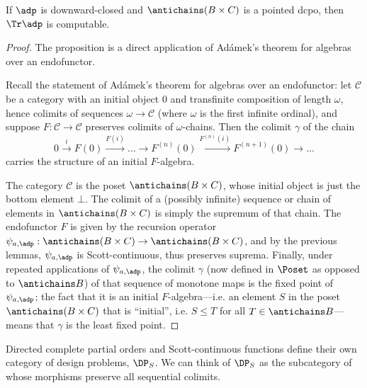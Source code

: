 

\begin{proposition}
If $\adp$ is downward-closed and $\antichains (B \times C)$ is a pointed dcpo, then $\Tr \adp$ is computable.
\end{proposition}

\begin{proof}
The proposition is a direct application of Ad\'amek's theorem for algebras over an endofunctor.

Recall the statement of Ad\'amek's theorem for algebras over an endofunctor: let $\mathcal{C}$ be a category with an initial object $0$ and transfinite composition of length $\omega$, hence colimits of sequences $\omega \to \mathcal{C}$ (where $\omega$ is the first infinite ordinal), and suppose $F: \mathcal{C} \to \mathcal{C}$ preserves colimits of $\omega$-chains. Then the colimit $\gamma$ of the chain \[0 \overset{i}{\to} F(0) \overset{F(i)}{\to} \ldots \to F^{(n)}(0) \overset{F^{(n)}(i)}{\to} F^{(n+1)}(0) \to \ldots\] carries the structure of an initial $F$-algebra.

The category $\mathcal{C}$ is the poset $\antichains (B \times C)$, whose initial object is just the bottom element $\bot$. The colimit of a (possibly infinite) sequence or chain of elements in $\antichains (B\times C)$ is simply the supremum of that chain. The endofunctor $F$ is given by the recursion operator $\psi_{a,\adp} : \antichains (B\times C) \to \antichains (B\times C)$, and by the previous lemmas, $\psi_{a,\adp}$ is Scott-continuous, thus preserves suprema. Finally, under repeated applications of $\psi_{a,\adp}$, the colimit $\gamma$ (now defined in $\Poset$ as opposed to $\antichains B$) of that sequence of monotone maps is the fixed point of $\psi_{a,\adp}$; the fact that it is an initial $F$-algebra---i.e. an element $S$ in the poset $\antichains (B\times C)$ that is ``initial'', i.e. $S \leq T$ for all $T \in \antichains B$---means that $\gamma$ is the least fixed point.
\end{proof}


Directed complete partial orders and Scott-continuous functions define their own category of design problems, $\DP_S$. We can think of $\DP_S$ as the subcategory of \DP whose morphisms preserve all sequential colimits.




